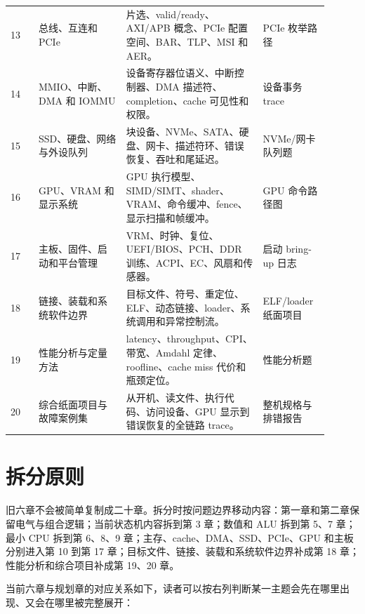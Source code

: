 \begin{longtable}{L{0.08\linewidth}L{0.25\linewidth}L{0.39\linewidth}L{0.18\linewidth}}
13 & 总线、互连和 PCIe & 片选、valid/ready、AXI/APB 概念、PCIe 配置空间、BAR、TLP、MSI 和 AER。 & PCIe 枚举路径 \\
14 & MMIO、中断、DMA 和 IOMMU & 设备寄存器位语义、中断控制器、DMA 描述符、completion、cache 可见性和权限。 & 设备事务 trace \\
15 & SSD、硬盘、网络与外设队列 & 块设备、NVMe、SATA、硬盘、网卡、描述符环、错误恢复、吞吐和尾延迟。 & NVMe/网卡队列题 \\
16 & GPU、VRAM 和显示系统 & GPU 执行模型、SIMD/SIMT、shader、VRAM、命令缓冲、fence、显示扫描和帧缓冲。 & GPU 命令路径图 \\
17 & 主板、固件、启动和平台管理 & VRM、时钟、复位、UEFI/BIOS、PCH、DDR 训练、ACPI、EC、风扇和传感器。 & 启动 bring-up 日志 \\
18 & 链接、装载和系统软件边界 & 目标文件、符号、重定位、ELF、动态链接、loader、系统调用和异常控制流。 & ELF/loader 纸面项目 \\
19 & 性能分析与定量方法 & latency、throughput、CPI、带宽、Amdahl 定律、roofline、cache miss 代价和瓶颈定位。 & 性能分析题 \\
20 & 综合纸面项目与故障案例集 & 从开机、读文件、执行代码、访问设备、GPU 显示到错误恢复的全链路 trace。 & 整机规格与排错报告 \\
\bottomrule
\end{longtable}

\section*{拆分原则}

旧六章不会被简单复制成二十章。拆分时按问题边界移动内容：第一章和第二章保留电气与组合逻辑；当前状态机内容拆到第 3 章；数值和 ALU 拆到第 5、7 章；最小 CPU 拆到第 6、8、9 章；主存、cache、DMA、SSD、PCIe、GPU 和主板分别进入第 10 到第 17 章；目标文件、链接、装载和系统软件边界补成第 18 章；性能分析和综合项目补成第 19、20 章。

当前六章与规划章的对应关系如下，读者可以按右列判断某一主题会先在哪里出现、又会在哪里被完整展开：

